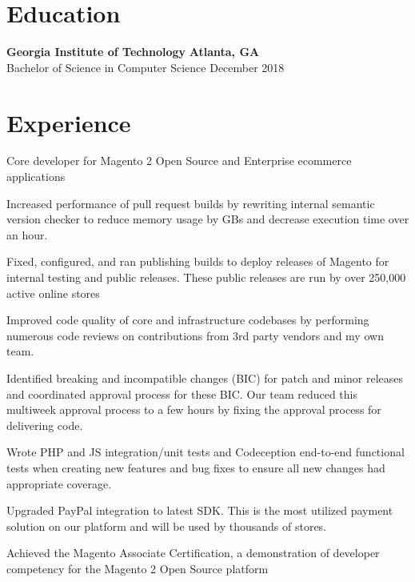 \documentclass[line]{resume}
\begin{document}
\begin{center}
\end{center}
\section{Education}
\textbf{Georgia Institute of Technology} \hfill \textbf{Atlanta, GA} \\
Bachelor of Science in Computer Science  \hfill December 2018

\vspace{-2px}
\section{Experience}
\vspace{-1px}

\begin{myitemize}
	\item Core developer for Magento 2 Open Source and Enterprise ecommerce applications
	\item Increased performance of pull request builds by rewriting internal semantic version checker to reduce memory usage by GBs and decrease execution time over an hour.
	\item Fixed, configured, and ran publishing builds to deploy releases of Magento for internal testing and public releases. These public releases are run by over 250,000 active online stores
	\item Improved code quality of core and infrastructure codebases by performing numerous code reviews on contributions from 3rd party vendors and my own team.
	\item Identified breaking and incompatible changes (BIC) for patch and minor releases and coordinated approval process for these BIC. Our team reduced this multiweek approval process to a few hours by fixing the approval process for delivering code.
	\item Wrote PHP and JS integration/unit tests and Codeception end-to-end functional tests when creating new features and bug fixes to ensure all new changes had appropriate coverage.
	\item Upgraded PayPal integration to latest SDK. This is the most utilized payment solution on our platform and will be used by thousands of stores.
	\item Achieved the Magento Associate Certification, a demonstration of developer competency for the Magento 2 Open Source platform
\end{myitemize}
\end{document}
